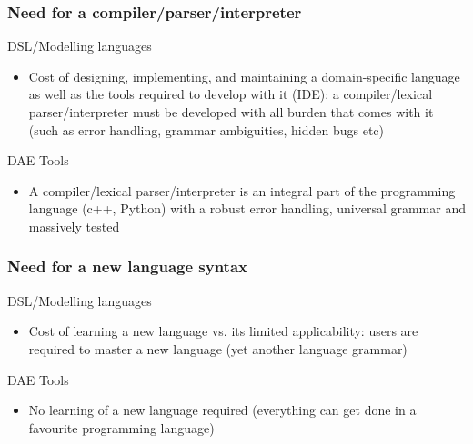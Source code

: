 \documentclass{beamer}
\begin{document}
\begin{frame}
\frametitle{Need for a compiler/parser/interpreter}
\begin{block}{\textcolor{light_red}{DSL/Modelling languages}}
\begin{itemize}
  \item Cost of designing, implementing, and maintaining a domain-specific language as well as the tools required to develop with it (IDE):
        a compiler/lexical parser/interpreter must be developed with all burden that comes with it (such as error handling, grammar ambiguities,
        hidden bugs etc)
\end{itemize}
\end{block}

\begin{block}{\textcolor{light_green}{DAE Tools}}
\begin{itemize}
  \item A compiler/lexical parser/interpreter is an integral part of the programming language (c++, Python) with a robust error handling,
        universal grammar and massively tested
\end{itemize}
\end{block}
\end{frame}

\begin{frame}
\frametitle{Need for a new language syntax}
\begin{block}{\textcolor{light_red}{DSL/Modelling languages}}
\begin{itemize}
  \item Cost of learning a new language vs. its limited applicability: users are required to master a new language
        (yet another language grammar)
\end{itemize}
\end{block}

\begin{block}{\textcolor{light_green}{DAE Tools}}
\begin{itemize}
  \item No learning of a new language required (everything can get done in a favourite programming language)
\end{itemize}
\end{block}
\end{frame}
\end{document}
